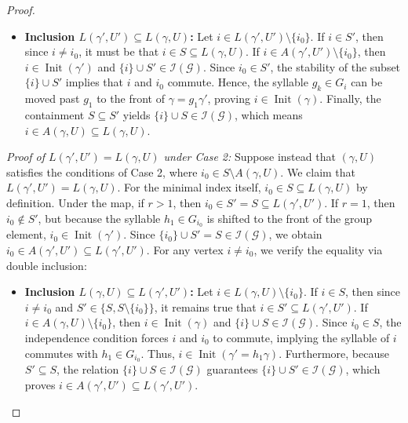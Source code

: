 \documentclass[11pt,reqno]{amsart}
\numberwithin{equation}{section} %
\theoremstyle{definition}
\theoremstyle{remark}
\numberwithin{equation}{section}
\begin{document}
\begin{proof}
\begin{itemize}
    \medskip
    \item \textbf{Inclusion $L(\gamma', U') \subseteq L(\gamma, U)$:} Let $i \in L(\gamma', U') \setminus \{i_0\}$. If $i \in S'$, then since $i \neq i_0$, it must be that $i \in S \subseteq L(\gamma, U)$. If $i \in A(\gamma', U') \setminus \{i_0\}$, then $i \in \operatorname{Init}(\gamma')$ and $\{i\} \cup S' \in \mathcal{I}(\mathcal{G})$. Since $i_0 \in S'$, the stability of the subset $\{i\} \cup S'$ implies that $i$ and $i_0$ commute. Hence, the syllable $g_k \in G_i$ can be moved past $g_1$ to the front of $\gamma = g_1 \gamma'$, proving $i \in \operatorname{Init}(\gamma)$. Finally, the containment $S \subseteq S'$ yields $\{i\} \cup S \in \mathcal{I}(\mathcal{G})$, which means $i \in A(\gamma, U) \subseteq L(\gamma, U)$.
\end{itemize}

\smallskip
\noindent\textit{ Proof of $L(\gamma', U') = L(\gamma, U)$  under Case 2:}
Suppose instead that $(\gamma, U)$ satisfies the conditions of Case 2, where $i_0 \in S \setminus A(\gamma, U)$. We claim that $L(\gamma', U') = L(\gamma, U)$. For the minimal index itself, $i_0 \in S \subseteq L(\gamma, U)$ by definition. Under the map, if $r > 1$, then $i_0 \in S' = S \subseteq L(\gamma', U')$. If $r = 1$, then $i_0 \notin S'$, but because the syllable $h_1 \in G_{i_0}$ is shifted to the front of the group element, $i_0 \in \operatorname{Init}(\gamma')$. Since $\{i_0\} \cup S' = S \in \mathcal{I}(\mathcal{G})$, we obtain $i_0 \in A(\gamma', U') \subseteq L(\gamma', U')$. For any vertex $i \neq i_0$, we verify the equality via double inclusion:
\begin{itemize}
    \item \textbf{Inclusion $L(\gamma, U) \subseteq L(\gamma', U')$:} Let $i \in L(\gamma, U) \setminus \{i_0\}$. If $i \in S$, then since $i \neq i_0$ and $S' \in \{S, S \setminus \{i_0\}\}$, it remains true that $i \in S' \subseteq L(\gamma', U')$. If $i \in A(\gamma, U) \setminus \{i_0\}$, then $i \in \operatorname{Init}(\gamma)$ and $\{i\} \cup S \in \mathcal{I}(\mathcal{G})$. Since $i_0 \in S$, the independence condition forces $i$ and $i_0$ to commute, implying the syllable of $i$ commutes with $h_1 \in G_{i_0}$. Thus, $i \in \operatorname{Init}(\gamma' = h_1 \gamma)$. Furthermore, because $S' \subseteq S$, the relation $\{i\} \cup S \in \mathcal{I}(\mathcal{G})$ guarantees $\{i\} \cup S' \in \mathcal{I}(\mathcal{G})$, which proves $i \in A(\gamma', U') \subseteq L(\gamma', U')$.


\end{itemize}
\end{proof}
\end{document}
